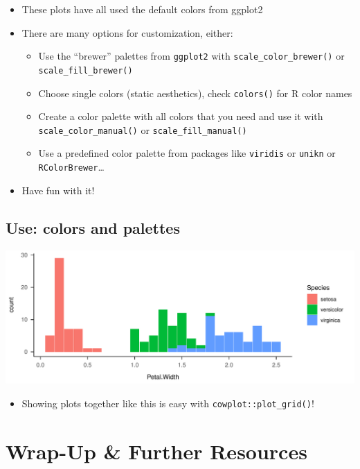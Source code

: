 \documentclass[
]{book}
\providecommand{\tightlist}{%
  \setlength{\itemsep}{0pt}\setlength{\parskip}{0pt}}
\begin{document}
\begin{itemize}
\tightlist
\item
  These plots have all used the default colors from ggplot2
\item
  There are many options for customization, either:

  \begin{itemize}
  \tightlist
  \item
    Use the ``brewer'' palettes from \texttt{ggplot2} with \texttt{scale\_color\_brewer()} or \texttt{scale\_fill\_brewer()}
  \item
    Choose single colors (static aesthetics), check \texttt{colors()} for R color names
  \item
    Create a color palette with all colors that you need and use it with \texttt{scale\_color\_manual()} or \texttt{scale\_fill\_manual()}
  \item
    Use a predefined color palette from packages like \texttt{viridis} or \texttt{unikn} or \texttt{RColorBrewer}\ldots{}
  \end{itemize}
\item
  Have fun with it!
\end{itemize}

\subsection{Use: colors and palettes}\label{use-colors-and-palettes}

\includegraphics{_main_files/figure-latex/unnamed-chunk-53-1.pdf}

\begin{itemize}
\tightlist
\item
  Showing plots together like this is easy with \texttt{cowplot::plot\_grid()}!
\end{itemize}

\section{Wrap-Up \& Further Resources}\label{wrap-up-further-resources-5}
\end{document}
